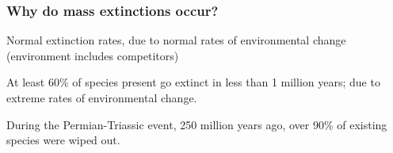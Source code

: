 \begin{noheadline}
\begin{frame}[t]
    \frametitle{Why do mass extinctions occur?}
    \begin{adjustwidth}{-2em}{-1.5em}

        \begin{description}
            \item<1->[Background extinction]
                Normal extinction rates, due to normal rates of
                environmental change (environment includes competitors)

            \vspace{15mm}
            \item<2->[Mass extinction]
                At least 60\% of species present go extinct in less than 1
                million years; due to extreme rates of environmental
                change.
        \end{description}

        \vspace{15mm}

    \end{adjustwidth}
\end{frame}
\end{noheadline}

\begin{frame}[t]
    \begin{adjustwidth}{-2em}{-1.5em}
        During the Permian-Triassic event, 250 million years ago, over 90\% of
        existing species were wiped out.

    \end{adjustwidth}
\end{frame}

